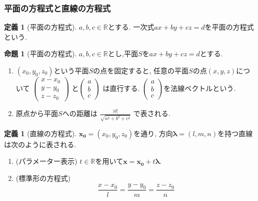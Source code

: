 \documentclass[dvipdfmx,a4paper,11pt]{article}
\newcommand{\R}{\mathbb{R}}
\theoremstyle{definition}
\newtheorem{prop}[thm]{命題}
\newtheorem{dfn}[thm]{定義}
\begin{document}
 
 \subsubsection{平面の方程式と直線の方程式}
 
\begin{tcolorbox}[
    colback = white,
    colframe = green!35!black,
    fonttitle = \bfseries,
    breakable = true]
    \begin{dfn}[平面の方程式]
$a, b, c \in \R$とする. 
一次式$ax + by + cz=d$を平面の方程式という. 
\end{dfn}
 \end{tcolorbox}
 
\begin{tcolorbox}[
    colback = white,
    colframe = green!35!black,
    fonttitle = \bfseries,
    breakable = true]
    \begin{prop}[平面の方程式]
$a, b, c \in \R$とし,平面$S$を$ax + by + cz=d$とする.
\begin{enumerate}
\setlength{\parskip}{0cm} 
\setlength{\itemsep}{0cm}
\item $(x_0, y_0, z_0)$という平面$S$の点を固定すると, 任意の平面$S$の点$(x,y,z)$について
$
\begin{pmatrix} x -x_0\\y-y_0\\z-z_0
\end{pmatrix}
$
と$\begin{pmatrix} a\\b\\c
\end{pmatrix}
$
は直行する. 
$\begin{pmatrix} a\\b\\c
\end{pmatrix}
$を法線ベクトルという.
\item 原点から平面$S$への距離は
$
\frac{|d|}{\sqrt{a^2 + b^2 + c^2}}
$
で表される. 
\end{enumerate}
\end{prop}
 \end{tcolorbox}
 
 \begin{tcolorbox}[
    colback = white,
    colframe = green!35!black,
    fonttitle = \bfseries,
    breakable = true]
    \begin{dfn}[直線の方程式]
$\bm{x_0}= (x_0, y_0, z_0)$を通り, 方向$\bm{\lambda}=(l,m,n)$を持つ直線は次のように表される.
\begin{enumerate}
\setlength{\parskip}{0cm} 
\setlength{\itemsep}{0cm}
\item (パラメーター表示) $t \in \R$を用いて$\bm{x}=\bm{x_0} + t \bm{\lambda}$.
\item (標準形の方程式) 
$$
\frac{x -x_0}{l}
=
\frac{y -y_0}{m}
=
\frac{z -z_0}{n}
$$
\end{enumerate}
\end{dfn}
 \end{tcolorbox}
\end{document}

